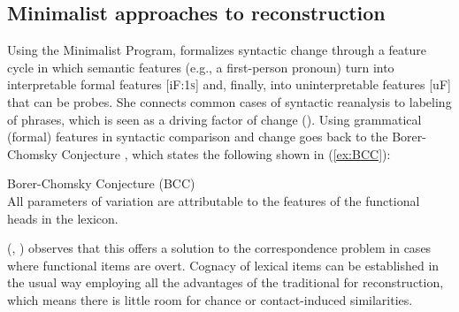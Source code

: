 \documentclass[output=paper,colorlinks,citecolor=brown]{langscibook}
\begin{document}
\subsection{Minimalist approaches to reconstruction}
\label{sec:minapproaches}

Using the Minimalist Program, \citet{mm:vangelderen2011linguistic} formalizes syntactic change through a feature cycle in which semantic features (e.g., a first-person pronoun) turn into interpretable formal features [iF:\textsc{1s}] and, finally, into uninterpretable features [uF] that can be probes. She connects common cases of syntactic reanalysis to labeling of phrases, which is seen as a driving factor of change (\citealt{mm:vangelderen2021third}). Using grammatical (formal) features in syntactic comparison and change goes back to the Borer-Chomsky Conjecture \citep[155]{mm:baker_macroparameter_2008}, which states the following shown in (\ref{ex:BCC}):

\ea  Borer-Chomsky Conjecture (BCC)\smallskip\\
All parameters of variation are attributable to the features of the functional heads in the lexicon.
\label{ex:BCC}
\z 
{}

\noindent \citeauthor{mm:walkden_comparative_2009} (\citeyear{mm:walkden_comparative_2009}, \citeyear{mm:Walkden2014})  observes that this offers a solution to the correspondence problem in cases where functional items are overt. Cognacy of lexical items can be established in the usual way employing all the advantages of the traditional  for reconstruction, which means there is little room for chance or contact-induced similarities. 
\end{document}
